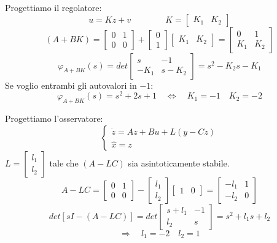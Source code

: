 \documentclass[../main.tex]{subfiles}
\begin{document}
\begin{mdframed}[style=Exercise]
\begin{Exercise}[title={Stabilizzazione di un sistema con osservatore}, difficulty=1]
				Progettiamo il regolatore:
				\[
					u = Kz + v \qquad\qquad K =
					\begin{bmatrix}
						K_1 & K_2
					\end{bmatrix}
				\]
				\[
					(A+BK) =
					\begin{bmatrix}
						0 & 1\\
						0 & 0
					\end{bmatrix} +
					\begin{bmatrix}
						0\\
						1
					\end{bmatrix}
					\begin{bmatrix}
						K_1 & K_2
					\end{bmatrix} =
					\begin{bmatrix}
						0 & 1\\
						K_1 & K_2
					\end{bmatrix}
				\]
				\[
					\varphi_{A+BK}(s) = det
					\begin{bmatrix}
						s & -1\\
						-K_1 & s-K_2
					\end{bmatrix} = s^2 - K_2s - K_1
				\]
				Se voglio entrambi gli autovalori in $ -1 $:
				\[
					\varphi_{A+BK}(s) = s^2 + 2s + 1 \quad\Leftrightarrow\quad K_1 = -1 \quad K_2 = -2
				\]
				
				Progettiamo l'osservatore:
				\[
					\begin{cases}
						\dot z = Az + Bu +L(y-Cz)\\
						\hat x = z
					\end{cases}
				\]
				$ L = \begin{bmatrix} l_1 \\ l_2 \end{bmatrix} $ tale che $ (A-LC) $ sia asintoticamente stabile.
				\[
					A-LC = 
					\begin{bmatrix}
						0 & 1\\
						0 & 0
					\end{bmatrix} -
					\begin{bmatrix}
						l_1\\
						l_2
					\end{bmatrix}
					\begin{bmatrix}
						1 & 0
					\end{bmatrix} = 
					\begin{bmatrix}
						-l_1 & 1\\
						-l_2 & 0
					\end{bmatrix}
				\]
				\[
					det\left[ sI - (A-LC) \right] = det 
					\begin{bmatrix}
						s+l_1 & -1\\
						l_2 & s
					\end{bmatrix} = s^2 + l_1 s + l_2
				\]
				\[
					\Rightarrow\quad l_1 = -2 \quad l_2 = 1
				\]
			\end{Exercise}
		\end{mdframed}
\end{document}
